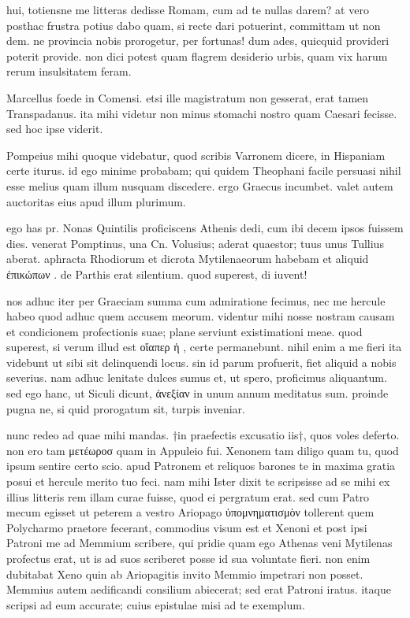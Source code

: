 


 hui, totiensne me litteras dedisse Romam, cum ad te nullas darem? at vero posthac frustra potius dabo quam, si recte dari potuerint, committam ut non dem. ne provincia nobis prorogetur, per fortunas! dum ades, quicquid provideri poterit provide. non dici potest quam flagrem desiderio urbis, quam vix harum rerum insulsitatem feram.

 Marcellus foede in Comensi. etsi ille magistratum non gesserat, erat tamen Transpadanus. ita mihi videtur non minus stomachi nostro quam Caesari fecisse. sed hoc ipse viderit.

 Pompeius mihi quoque videbatur, quod scribis Varronem dicere, in Hispaniam certe iturus. id ego minime probabam; qui quidem Theophani facile persuasi nihil esse melius quam illum nusquam discedere. ergo Graecus incumbet. valet autem auctoritas eius apud illum plurimum.

 ego has pr. Nonas Quintilis proficiscens Athenis dedi, cum ibi decem ipsos fuissem dies. venerat Pomptinus, una Cn. Volusius; aderat quaestor; tuus unus Tullius aberat. aphracta Rhodiorum et dicrota Mytilenaeorum habebam et aliquid ἐπικώπων . de Parthis erat silentium. quod superest, di iuvent!

 nos adhuc iter per Graeciam summa cum admiratione fecimus, nec me hercule habeo quod adhuc quem accusem meorum. videntur mihi nosse nostram causam et condicionem profectionis suae; plane serviunt existimationi meae. quod superest, si verum illud est οἵαπερ ἡ , certe permanebunt. nihil enim a me fieri ita videbunt ut sibi sit delinquendi locus. sin id parum profuerit, fiet aliquid a nobis severius. nam adhuc lenitate dulces sumus et, ut spero, proficimus aliquantum. sed ego hanc, ut Siculi dicunt, ἀνεξίαν in unum annum meditatus sum. proinde pugna ne, si quid prorogatum sit, turpis inveniar.

 nunc redeo ad quae mihi mandas. †in praefectis excusatio iis†, quos voles deferto. non ero tam μετέωροσ quam in Appuleio fui. Xenonem tam diligo quam tu, quod ipsum sentire certo scio. apud Patronem et reliquos barones te in maxima gratia posui et hercule merito tuo feci. nam mihi Ister dixit te scripsisse ad se mihi ex illius litteris rem illam curae fuisse, quod ei pergratum erat. sed cum Patro mecum egisset ut peterem a vestro Ariopago ὑπομνηματισμὸν tollerent quem Polycharmo praetore fecerant, commodius visum est et Xenoni et post ipsi Patroni me ad Memmium scribere, qui pridie quam ego Athenas veni Mytilenas profectus erat, ut is ad suos scriberet posse id sua voluntate fieri. non enim dubitabat Xeno quin ab Ariopagitis invito Memmio impetrari non posset. Memmius autem aedificandi consilium abiecerat; sed erat Patroni iratus. itaque scripsi ad eum accurate; cuius epistulae misi ad te exemplum.

